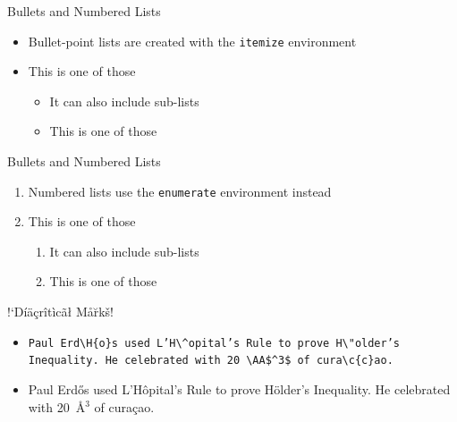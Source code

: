 \documentclass{beamer} %
\begin{document}
\begin{frame}{Bullets and Numbered Lists}

\begin{itemize}
	\item Bullet-point lists are created with the \texttt{itemize} environment
	\item This is one of those
	\begin{itemize}
		\item It can also include sub-lists
		\item This is one of those
	\end{itemize}
\end{itemize}

\end{frame}

\begin{frame}{Bullets and Numbered Lists}

\begin{enumerate}
	\item Numbered lists use the \texttt{enumerate} environment instead
	\item This is one of those
	\begin{enumerate}[a]
		\item It can also include sub-lists
		\item This is one of those
	\end{enumerate}
\end{enumerate}

\end{frame}

\begin{frame}{!`D\'i\"a\c{c}r\^it\`ic\~a\l{} M\aa \u{r}k\v{s}!}

\begin{itemize}
	\item \texttt{Paul Erd\textbackslash H\{o\}s used L'H\textbackslash\^{}opital's Rule to prove H\textbackslash"older's Inequality. He celebrated with 20~\textbackslash AA\$\^{}3\$ of cura\textbackslash c\{c\}ao.}
	\item Paul Erd\H{o}s used L'H\^opital's Rule to prove H\"older's Inequality. He celebrated with 20~\AA$^3$ of cura\c{c}ao.
\end{itemize}

\end{frame}
\end{document}
